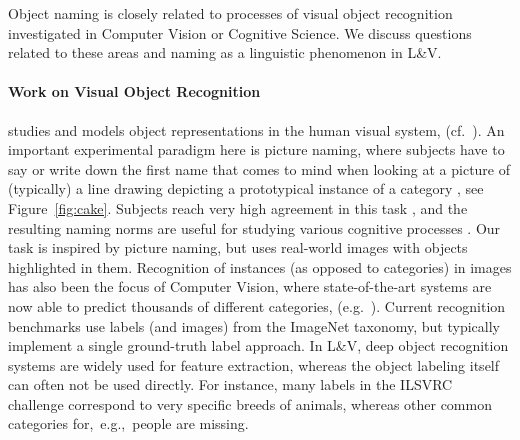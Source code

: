 
Object naming is closely related to processes of visual object recognition investigated in Computer Vision or Cognitive Science.
We discuss questions related to these areas and naming as a linguistic phenomenon in L\&V.

\paragraph{Work on Visual Object Recognition} studies and models object representations in the human visual system, (cf.\ ). 
An important experimental paradigm here is picture naming, where subjects have to say or write down the first name that comes to mind when looking at a picture of (typically) a line drawing depicting a prototypical instance of a category \cite{snodgrass}, see Figure\ \ref{fig:cake}.
Subjects reach very high agreement in this task \cite{rossion2004revisiting}, and the resulting naming norms are useful for studying various cognitive processes \cite{humphreys1988cascade}.
Our task is inspired by picture naming, but uses real-world images with objects highlighted in them.
Recognition of instances (as opposed to categories) in images has also been the focus of Computer Vision, where state-of-the-art systems are now able to predict thousands of different categories, (e.g.\ ). 
Current recognition benchmarks use labels (and images) from the ImageNet \cite{imagenet_cvpr09} taxonomy, but typically implement a single ground-truth label approach. 
In L\&V, deep object recognition systems are widely used for feature extraction, whereas the object labeling itself can often not be used directly. For instance, many labels in the ILSVRC  challenge \cite{ILSVRC15} correspond to very specific breeds of animals, whereas other common categories  for,\ e.g.,\ people are missing.


